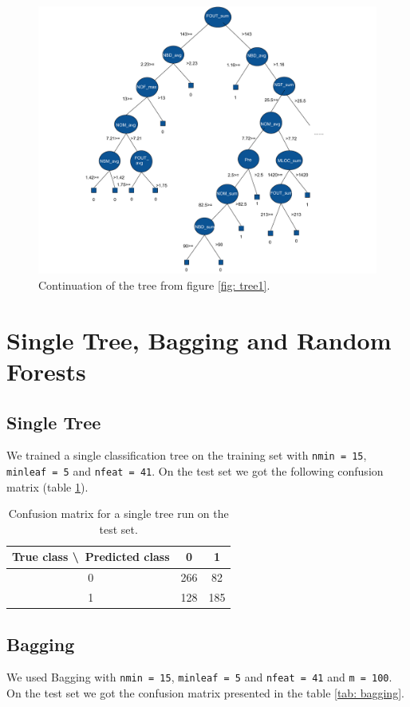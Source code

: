 \documentclass[a4paper,11pt]{article}
\begin{document}
\begin{figure}[h!]
\includegraphics[width=\textwidth]{Tree2.pdf}
\caption{Continuation of the tree from figure \ref{fig: tree1}.} 
\label{fig: tree2}
\end{figure}

\section{Single Tree, Bagging and Random Forests}

\subsection{Single Tree}
We trained a single classification tree on the training set with \verb|nmin = 15|, \verb|minleaf = 5| and \verb|nfeat = 41|. On the test set we got the following confusion matrix (table \ref{tab: singletree}).
 
\begin{table}[h!]
\centering
	\begin{tabular}{c||c|c}
	True class \textbackslash\ Predicted class & 0 & 1 \\ \hline \hline
	0 & 266 & 82 \\ \hline
	1 & 128 & 185
	\end{tabular}
	\caption{Confusion matrix for a single tree run on the test set.}
	\label{tab: singletree}
\end{table}


\subsection{Bagging}
We used Bagging with \verb|nmin = 15|, \verb|minleaf = 5| and \verb|nfeat = 41| and \verb|m = 100|. On the test set we got the confusion matrix presented in the table \ref{tab: bagging}.
\end{document}
